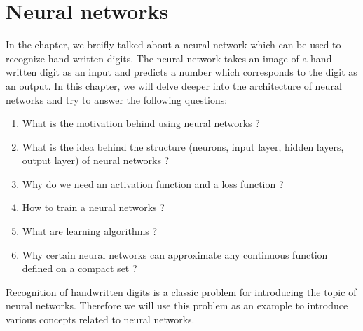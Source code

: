\chapter{Neural networks} %

\label{Chapter3} %
\setcounter{chapter}{3}
In the  chapter, we breifly talked about a neural network which can be used 
to recognize hand-written digits. The neural network takes an image of a hand-written digit as 
an input and predicts a number which corresponds to the digit as an output. In this chapter, 
we will delve deeper into the architecture of neural networks and try to answer the following questions:
\begin{enumerate}
    \item What is the motivation behind using neural networks ?
    \item What is the idea behind the structure (neurons, input layer, hidden layers, output layer) 
    of neural networks ?
    \item Why do we need an activation function and a loss function ?
    \item How to train a neural networks ?
    \item What are learning algorithms ?
    \item Why certain neural networks can approximate any continuous function defined on a compact set ?
\end{enumerate}
Recognition of handwritten digits is a classic problem for introducing the topic of neural networks. Therefore 
we will use this problem as an example to introduce various concepts related to neural networks.
